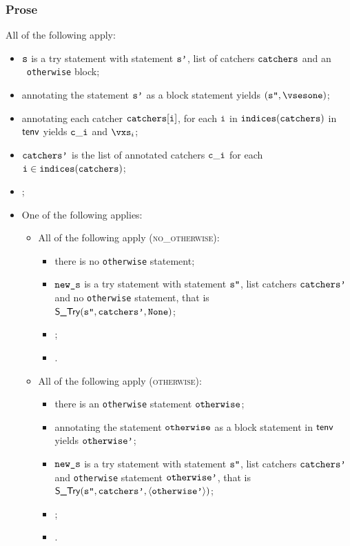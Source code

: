 \subsubsection{Prose}
All of the following apply:
\begin{itemize}
  \item $\texttt{s}$ is a try statement with statement $\texttt{s'}$, list of catchers $\texttt{catchers}$ and an \optional\ \texttt{otherwise} block;
  \item annotating the statement $\texttt{s'}$ as a block statement yields $(\vspp, \vsesone)$\ProseOrTypeError;
  \item annotating each catcher $\texttt{catchers}[\texttt{i}]$, for each $\texttt{i}$ in $\texttt{indices}(\texttt{catchers})$ in $\textsf{tenv}$ yields $\texttt{c}\_\texttt{i}$
        and $\vxs_i$\ProseOrTypeError;
  \item $\texttt{catchers'}$ is the list of annotated catchers $\texttt{c}\_\texttt{i}$ for each $\texttt{i}\in\texttt{indices}(\texttt{catchers})$;
  \item {};
  \item One of the following applies:
  \begin{itemize}
    \item All of the following apply (\textsc{no\_otherwise}):
    \begin{itemize}
      \item there is no \texttt{otherwise} statement;
      \item $\texttt{new\_s}$ is a try statement with statement $\texttt{s''}$, list catchers $\texttt{catchers'}$ and no \texttt{otherwise} statement,
            that is \\
            $\textsf{S\_Try}(\texttt{s''}, \texttt{catchers'}, \texttt{None})$;
      \item {};
      \item \Proseeqdef{$\vsesthree$}{$\vsestwo$}.
    \end{itemize}

    \item All of the following apply (\textsc{otherwise}):
    \begin{itemize}
      \item there is an \texttt{otherwise} statement $\texttt{otherwise}$;
      \item annotating the statement $\texttt{otherwise}$ as a block statement in $\textsf{tenv}$ yields $\texttt{otherwise'}$\ProseOrTypeError;
      \item $\texttt{new\_s}$ is a try statement with statement $\texttt{s''}$, list catchers $\texttt{catchers'}$ and \texttt{otherwise} statement
            $\texttt{otherwise'}$, that is \\
            $\textsf{S\_Try}(\texttt{s''}, \texttt{catchers'}, \langle\texttt{otherwise'}\rangle)$;
      \item \Proseeqdef{$\vsesotherwise$}{$\vsesblock$};
      \item {}.
    \end{itemize}


\end{itemize}
\end{itemize}
